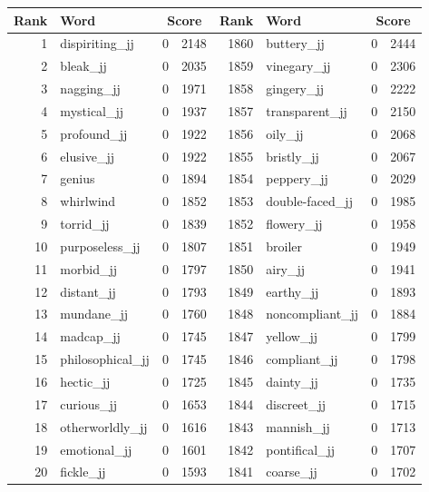 \begin{table}[tbp]
    \begin{tabular}{| rlr@{.}l | rlr@{.}l |}
    \hline
    \textbf{Rank} & \textbf{Word} & \multicolumn{2}{c|}{\textbf{Score}} & \textbf{Rank} & \textbf{Word} & \multicolumn{2}{c|}{\textbf{Score}} \\
    \hline
    1 & dispiriting\_jj & 0 & 2148    &    1860 & buttery\_jj & 0 & 2444 \\
    2 & bleak\_jj & 0 & 2035    &    1859 & vinegary\_jj & 0 & 2306 \\
    3 & nagging\_jj & 0 & 1971    &    1858 & gingery\_jj & 0 & 2222 \\
    4 & mystical\_jj & 0 & 1937    &    1857 & transparent\_jj & 0 & 2150 \\
    5 & profound\_jj & 0 & 1922    &    1856 & oily\_jj & 0 & 2068 \\
    6 & elusive\_jj & 0 & 1922    &    1855 & bristly\_jj & 0 & 2067 \\
    7 & genius & 0 & 1894    &    1854 & peppery\_jj & 0 & 2029 \\
    8 & whirlwind & 0 & 1852    &    1853 & double-faced\_jj & 0 & 1985 \\
    9 & torrid\_jj & 0 & 1839    &    1852 & flowery\_jj & 0 & 1958 \\
    10 & purposeless\_jj & 0 & 1807    &    1851 & broiler & 0 & 1949 \\
    11 & morbid\_jj & 0 & 1797    &    1850 & airy\_jj & 0 & 1941 \\
    12 & distant\_jj & 0 & 1793    &    1849 & earthy\_jj & 0 & 1893 \\
    13 & mundane\_jj & 0 & 1760    &    1848 & noncompliant\_jj & 0 & 1884 \\
    14 & madcap\_jj & 0 & 1745    &    1847 & yellow\_jj & 0 & 1799 \\
    15 & philosophical\_jj & 0 & 1745    &    1846 & compliant\_jj & 0 & 1798 \\
    16 & hectic\_jj & 0 & 1725    &    1845 & dainty\_jj & 0 & 1735 \\
    17 & curious\_jj & 0 & 1653    &    1844 & discreet\_jj & 0 & 1715 \\
    18 & otherworldly\_jj & 0 & 1616    &    1843 & mannish\_jj & 0 & 1713 \\
    19 & emotional\_jj & 0 & 1601    &    1842 & pontifical\_jj & 0 & 1707 \\
    20 & fickle\_jj & 0 & 1593    &    1841 & coarse\_jj & 0 & 1702 \\

\end{tabular}
\end{table}
